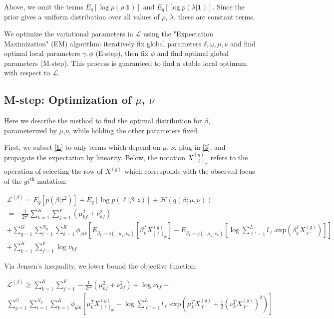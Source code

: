 \documentclass{article}
\newcommand{\Lagr}{\mathcal{L}}
\begin{document}
Above, we omit the terms $E_q[\log p(\rho| \textbf{1})]$ and $E_q[\log p(\lambda| \textbf{1})]$. Since the prior gives a uniform distribution over all values of $\rho$, $\lambda$, these are constant terms.

We optimize the variational parameters in $\Lagr$ using the "Expectation Maximization" (EM) algorithm: iteratively fix global parameters $\delta, \omega, \mu, \nu$ and find optimal local parameters $\gamma, \phi$ (E-step), then fix $\phi$ and find optimal global parameters (M-step). This process is guaranteed to find a stable local optimum with respect to $\Lagr$.


\subsection{M-step: Optimization of $\mu$, $\nu$}

Here we describe the method to find the optimal distribution for $\beta$, parameterized by $\mu$,$\nu$, while holding the other parameters fixed.

First, we subset \eqref{L} to only terms which depend on $\mu$, $\nu$, plug in \eqref{3}, and propagate the expectation by linearity. Below, the notation $X^{(g)}_{[\ell]_{gi}}$ refers to the operation of selecting the row of $X^{(g)}$ which corresponds with the observed locus of the $gi^\mathrm{th}$ mutation:

\begin{equation}
\begin{split}
\Lagr^{(\beta)} = E_q[p(\beta | \tau^2)] + E_q[\log p(\ell | \beta, z)] + \mathcal{H}(q(\beta;\mu, \nu)) \\
	= -\frac{1}{2\tau^2}\sum_{k=1}^K \sum_{f=1}^F \left( \mu_{kf}^2 + \nu_{kf}^2 \right) \\
	+ \sum_{g=1}^G \sum_{i=1}^{N_g} \sum_{k=1}^K  \phi_{gik} \left[ E_{\beta_k \sim q(.;\mu_k,\nu_k)} [\beta_k^T X^{(g)}_{[\ell]_{gi}}] - E_{\beta_k \sim q(.;\mu_k,\nu_k)} [\log{\sum_{\ell'=1}^L l_{\ell'} \textrm{exp}( \beta_k^T X^{(g)}_{\ell'} )}] \right] \\
	+ \sum_{k=1}^K \sum_{f=1}^F \log \nu_{kf}
\end{split}
\end{equation}

Via Jensen's inequality, we lower bound the objective function:

\begin{equation}
\begin{split}
\Lagr^{(\beta)} \geq \sum_{k=1}^K \sum_{f=1}^F -\frac{1}{2\tau^2}\left(\mu_{kf}^2 + \nu_{kf}^2 \right) + \log \nu_{kf} + \\
	\sum_{g=1}^G \sum_{i=1}^{N_g} \sum_{k=1}^K  \phi_{gik} \left[ \mu_k^T X^{(g)}_{[\ell]_{gi}} - \log{\sum_{\ell'=1}^L l_{\ell'} \textrm{exp}\left( \mu_k^T X^{(g)}_{\ell'} + \frac{1}{2}(\nu_k^T X^{(g)}_{\ell'})^2\right) } \right]
\end{split}
\end{equation}
\end{document}
